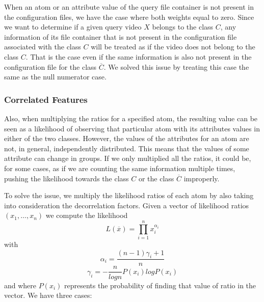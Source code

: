 When an atom or an attribute value of the query file container is not present in the configuration files, we have the case where both weights equal to zero. Since we want to determine if a given query video $X$ belongs to the class $C$, any information of its file container that is not present in the configuration file associated with the class $C$ will be treated as if the video does not belong to the class $C$. That is the case even if the same information is also not present in the configuration file for the class $\overline{C}$. We solved this issue by treating this case the same as the null numerator case.

\subsubsection*{Correlated Features}

Also, when multiplying the ratios for a specified atom, the resulting value can be seen as a likelihood of observing that particular atom with its attributes values in either of the two classes. However, the values of the attributes for an atom are not, in general, independently distributed. This means that the values of some attribute can change in groups. If we only multiplied all the ratios, it could be, for some cases, as if we are counting the same information multiple times, pushing the likelihood towards the class $C$ or the class $\overline{C}$ improperly.

To solve the issue, we multiply the likelihood ratios of each atom by also taking into consideration the decorrelation factors.
Given a vector of likelihood ratios $(x_{1},\ldots,x_{n})$ we compute the likelihood $$ L(\overline{x}) = \prod\limits_{i=1}^{n} x_{i}^{\alpha_{i}} $$ with $$ \alpha_{i} = \dfrac{(n-1)\gamma_{i}+1}{n} $$ $$ \gamma_{i} = - \dfrac{n}{log n} P(x_{i})log P(x_{i}) $$ and where $P(x_{i})$ represents the probability of finding that value of ratio in the vector.
We have three cases:

